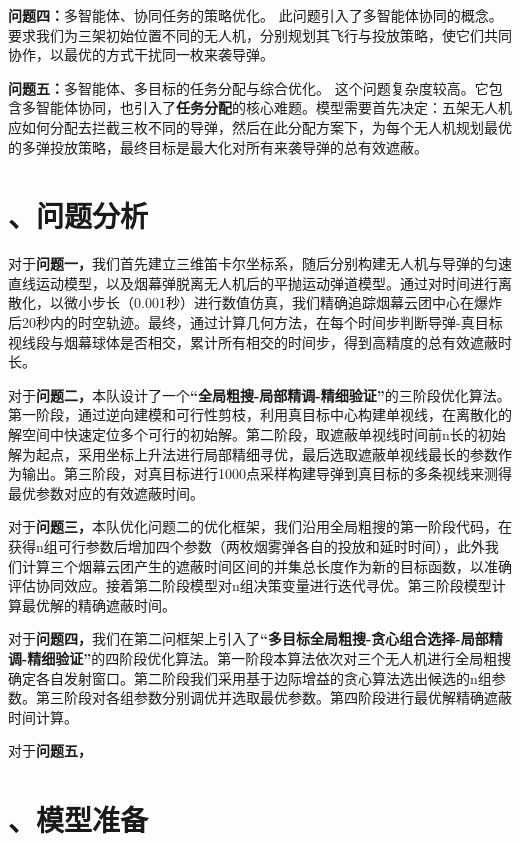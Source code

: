 \documentclass[12pt]{article}
\begin{document}
\begin{CJK}{UTF8}{gbsn}
	\textbf{问题四：}多智能体、协同任务的策略优化。
	此问题引入了多智能体协同的概念。要求我们为三架初始位置不同的无人机，分别规划其飞行与投放策略，使它们共同协作，以最优的方式干扰同一枚来袭导弹。
	
	\textbf{问题五：}多智能体、多目标的任务分配与综合优化。
	这个问题复杂度较高。它包含多智能体协同，也引入了\textbf{任务分配}的核心难题。模型需要首先决定：五架无人机应如何分配去拦截三枚不同的导弹，然后在此分配方案下，为每个无人机规划最优的多弹投放策略，最终目标是最大化对所有来袭导弹的总有效遮蔽。
	
	\section{、问题分析}

	
	对于\textbf{问题一，}我们首先建立三维笛卡尔坐标系，随后分别构建无人机与导弹的匀速直线运动模型，以及烟幕弹脱离无人机后的平抛运动弹道模型。通过对时间进行离散化，以微小步长（0.001秒）进行数值仿真，我们精确追踪烟幕云团中心在爆炸后20秒内的时空轨迹。最终，通过计算几何方法，在每个时间步判断导弹-真目标视线段与烟幕球体是否相交，累计所有相交的时间步，得到高精度的总有效遮蔽时长。
	
	对于\textbf{问题二，}本队设计了一个\textbf{“全局粗搜-局部精调-精细验证”}的三阶段优化算法。第一阶段，通过逆向建模和可行性剪枝，利用真目标中心构建单视线，在离散化的解空间中快速定位多个可行的初始解。第二阶段，取遮蔽单视线时间前n长的初始解为起点，采用坐标上升法进行局部精细寻优，最后选取遮蔽单视线最长的参数作为输出。第三阶段，对真目标进行1000点采样构建导弹到真目标的多条视线来测得最优参数对应的有效遮蔽时间。
	
	对于\textbf{问题三，}本队优化问题二的优化框架，我们沿用全局粗搜的第一阶段代码，在获得n组可行参数后增加四个参数（两枚烟雾弹各自的投放和延时时间），此外我们计算三个烟幕云团产生的遮蔽时间区间的并集总长度作为新的目标函数，以准确评估协同效应。接着第二阶段模型对n组决策变量进行迭代寻优。第三阶段模型计算最优解的精确遮蔽时间。
	
	对于\textbf{问题四，}我们在第二问框架上引入了\textbf{“多目标全局粗搜-贪心组合选择-局部精调-精细验证”}的四阶段优化算法。第一阶段本算法依次对三个无人机进行全局粗搜确定各自发射窗口。第二阶段我们采用基于边际增益的贪心算法选出候选的n组参数。第三阶段对各组参数分别调优并选取最优参数。第四阶段进行最优解精确遮蔽时间计算。
	
	对于\textbf{问题五，}
	
	
	\section{、模型准备}
	

\end{CJK}
\end{document}
